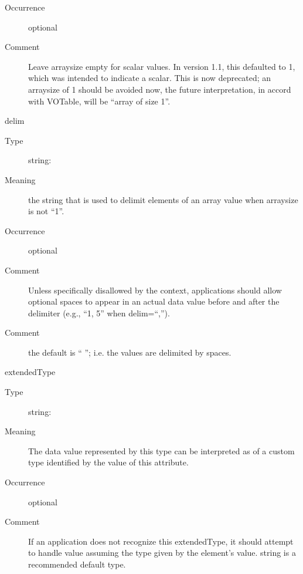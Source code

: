 \documentclass[11pt,a4paper]{ivoa}
\begin{document}
\begin{generated}
\begin{bigdescription}
\begin{description}
\item[Occurrence] optional

\item[Comment] 
                     Leave arraysize empty for scalar values.  In version 1.1,
                     this defaulted to 1, which was intended to indicate
                     a scalar.  This is now deprecated; an arraysize of 1 should
                     be avoided now, the future interpretation, in accord with
                     VOTable, will be “array of size 1”.
                  
\end{description}
\item[delim]
\begin{description}
\item[Type] string: 
\item[Meaning] 
                     the string that is used to delimit elements of an array
                     value when arraysize is not “1”.
                  
\item[Occurrence] optional
 
\item[Comment] 
                     Unless specifically disallowed by the context, 
                     applications should allow optional spaces to 
                     appear in an actual data value before and after 
                     the delimiter (e.g., “1, 5” when delim=“,”).
                  
\item[Comment] 
                     the default is “ ”; i.e. the values are delimited 
                     by spaces.  
                  
\end{description}
\item[extendedType]
\begin{description}
\item[Type] string: 
\item[Meaning] 
                     The data value represented by this type can be
                     interpreted as of a custom type identified by 
                     the value of this attribute.
                  
\item[Occurrence] optional
\item[Comment] 
                     If an application does not recognize this
                     extendedType, it should attempt to handle value
                     assuming the type given by the element's value.
                     string is a recommended default type.
                  

\end{description}
\end{bigdescription}
\end{generated}
\end{document}
